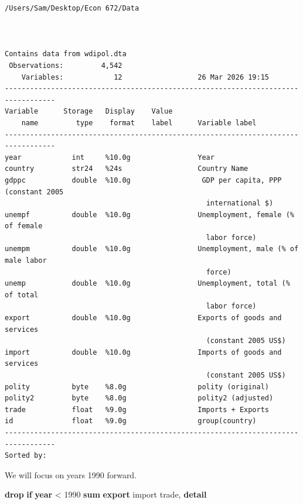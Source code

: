 \documentclass[
]{book}
\newenvironment{Shaded}{\begin{snugshade}}{\end{snugshade}}
\newcommand{\FunctionTok}[1]{\textcolor[rgb]{0.13,0.29,0.53}{\textbf{#1}}}
\newcommand{\KeywordTok}[1]{\textcolor[rgb]{0.13,0.29,0.53}{\textbf{#1}}}
\newcommand{\NormalTok}[1]{#1}
\begin{document}
\begin{verbatim}
/Users/Sam/Desktop/Econ 672/Data



Contains data from wdipol.dta
 Observations:         4,542                  
    Variables:            12                  26 Mar 2026 19:15
----------------------------------------------------------------------------------
Variable      Storage   Display    Value
    name         type    format    label      Variable label
----------------------------------------------------------------------------------
year            int     %10.0g                Year
country         str24   %24s                  Country Name
gdppc           double  %10.0g                 GDP per capita, PPP (constant 2005
                                                international $)
unempf          double  %10.0g                Unemployment, female (% of female
                                                labor force)
unempm          double  %10.0g                Unemployment, male (% of male labor
                                                force)
unemp           double  %10.0g                Unemployment, total (% of total
                                                labor force)
export          double  %10.0g                Exports of goods and services
                                                (constant 2005 US$)
import          double  %10.0g                Imports of goods and services
                                                (constant 2005 US$)
polity          byte    %8.0g                 polity (original)
polity2         byte    %8.0g                 polity2 (adjusted)
trade           float   %9.0g                 Imports + Exports
id              float   %9.0g                 group(country)
----------------------------------------------------------------------------------
Sorted by: 
\end{verbatim}

We will focus on years 1990 forward.

\begin{Shaded}
\begin{Highlighting}[]
\KeywordTok{drop} \KeywordTok{if} \FunctionTok{year}\NormalTok{ \textless{} 1990}
\KeywordTok{sum} \KeywordTok{export}\NormalTok{ import trade, }\KeywordTok{detail}
\end{Highlighting}
\end{Shaded}
\end{document}
